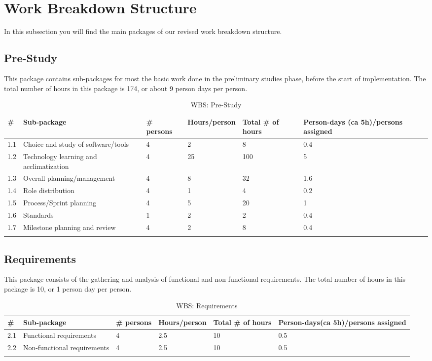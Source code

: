 \section{Work Breakdown Structure}
In this subsection you will find the main packages of our revised work breakdown structure.

\subsection{Pre-Study}
This package contains sub-packages for most the basic work done in the preliminary studies phase, before the start of implementation. The total number of hours in this package is 174, or about 9 person days per person.
\begin{longtable}{|p{0.7cm}|p{3cm}|p{1.8cm}|p{2.5cm}|p{2cm}|p{2.8cm}|}
\hline
\# & Sub-package & \# persons & Hours/person & Total \# of hours & Person-days (ca 5h)/persons assigned\\ 
\hline
1.1 & Choice and study of software/tools & 4 & 2 & 8 & 0.4\\ 
\hline
1.2 & Technology learning and acclimatization & 4 & 25 & 100 & 5\\ 
\hline
1.3 & Overall planning/management & 4 & 8 & 32 & 1.6\\ 
\hline
1.4 & Role distribution & 4 & 1 & 4 & 0.2\\ 
\hline
1.5 & Process/Sprint planning & 4 & 5 & 20 & 1\\ 
\hline
1.6 & Standards & 1 & 2 & 2 & 0.4\\ 
\hline
1.7 & Milestone planning and review & 4 & 2 & 8 & 0.4\\ 
\hline
\caption{WBS: Pre-Study}
\end{longtable}

\newpage
\subsection{Requirements}
This package consists of the gathering and analysis of functional and non-functional requirements. The total number of hours in this package is 10, or 1 person day per person.
\begin{longtable}{|p{0.7cm}|p{3cm}|p{1.8cm}|p{2.5cm}|p{2cm}|p{2.8cm}|}
\hline
\# & Sub-package & \# persons & Hours/person & Total \# of hours & Person-days(ca 5h)/persons assigned\\ 
\hline
2.1 & Functional requirements & 4 & 2.5 & 10 & 0.5\\ 
\hline
2.2 & Non-functional requirements & 4 & 2.5 & 10 & 0.5\\ 
\hline

\caption{WBS: Requirements}
\end{longtable}

